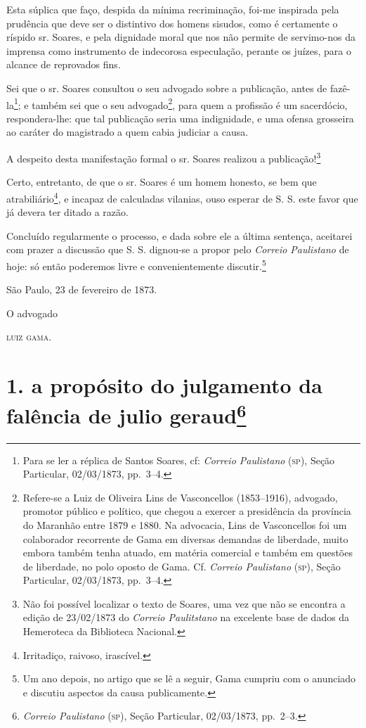 Esta súplica que faço, despida da mínima recriminação, foi-me inspirada
pela prudência que deve ser o distintivo dos homens sisudos, como é
certamente o ríspido sr. Soares, e pela dignidade moral que nos não
permite de servimo-nos da imprensa como instrumento de indecorosa
especulação, perante os juízes, para o alcance de reprovados fins.

Sei que o sr. Soares consultou o seu advogado sobre a publicação, antes
de fazê-la\footnote{ Para se ler a réplica de Santos Soares, cf:
  \emph{Correio Paulistano} (\textsc{sp}), Seção Particular, 02/03/1873, pp.~3--4.};
e também sei que o seu advogado\footnote{ Refere-se a Luiz de Oliveira
  Lins de Vasconcellos (1853--1916), advogado, promotor público e
  político, que chegou a exercer a presidência da província do Maranhão
  entre 1879 e 1880. Na advocacia, Lins de Vasconcellos foi um
  colaborador recorrente de Gama em diversas demandas de liberdade,
  muito embora também tenha atuado, em matéria comercial e também em
  questões de liberdade, no polo oposto de Gama. Cf. \emph{Correio
  Paulistano} (\textsc{sp}), Seção Particular, 02/03/1873, pp.~3--4.}, para quem a
profissão é um sacerdócio, respondera-lhe: que tal publicação seria uma
indignidade, e uma ofensa grosseira ao caráter do magistrado a quem
cabia judiciar a causa.

A despeito desta manifestação formal o sr. Soares realizou a
publicação!\footnote{ Não foi possível localizar o texto de Soares, uma
  vez que não se encontra a edição de 23/02/1873 do \emph{Correio
  Paulitstano} na excelente base de dados da Hemeroteca da Biblioteca
  Nacional.}

Certo, entretanto, de que o sr. Soares é um homem honesto, se bem que
atrabiliário\footnote{ Irritadiço, raivoso, irascível.}, e incapaz de
calculadas vilanias, ouso esperar de S. S. este favor que já devera ter
ditado a razão.

Concluído regularmente o processo, e dada sobre ele a última sentença,
aceitarei com prazer a discussão que S. S. dignou-se a propor pelo
\emph{Correio Paulistano} de hoje: só então poderemos livre e
convenientemente discutir.\footnote{ Um ano depois, no artigo que se lê
  a seguir, Gama cumpriu com o anunciado e discutiu aspectos da causa
  publicamente.}

São Paulo, 23 de fevereiro de 1873.

O advogado

\textsc{luiz gama}.

\chapter{1. a propósito do julgamento da falência de julio geraud\footnote{\emph{Correio Paulistano} (\textsc{sp}), Seção Particular,
  02/03/1873, pp.~2--3.}} %

